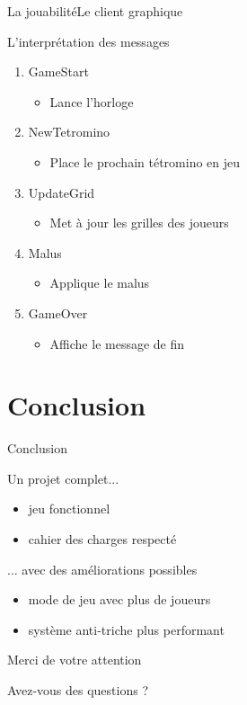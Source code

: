 \documentclass[french]{beamer}
\begin{document}
		\begin{frame}{La jouabilité}{Le client graphique}
			\begin{block}{L'interprétation des messages}				
				\begin{enumerate}
					\item GameStart
				    	\begin{itemize}
				    		\item Lance l'horloge
				    	\end{itemize}
				   	
				   	\item NewTetromino
				   		\begin{itemize}
				   			\item Place le prochain tétromino en jeu
				   		\end{itemize}

					\item UpdateGrid
				    	\begin{itemize}
				    		\item Met à jour les grilles des joueurs
				    	\end{itemize}

				    \item Malus
				    	\begin{itemize}
				    		\item Applique le malus
				    	\end{itemize}

					\item GameOver
				    	\begin{itemize}
				    		\item Affiche le message de fin
				    	\end{itemize}
				\end{enumerate}
			\end{block}
		\end{frame}

\section*{Conclusion}

		\begin{frame}{Conclusion}
			\begin{block}{Un projet complet...}
				\begin{itemize}
					\item jeu fonctionnel
					\item cahier des charges respecté
				\end{itemize}
			\end{block}

			\begin{block}{... avec des améliorations possibles}
				\begin{itemize}
					\item mode de jeu avec plus de joueurs
					\item système anti-triche plus performant
				\end{itemize}
			\end{block}
		\end{frame}

		\begin{frame}{Merci de votre attention}
			\begin{center}
				\Large{Avez-vous des questions ?}
			\end{center}
		\end{frame}




	
\end{document}
